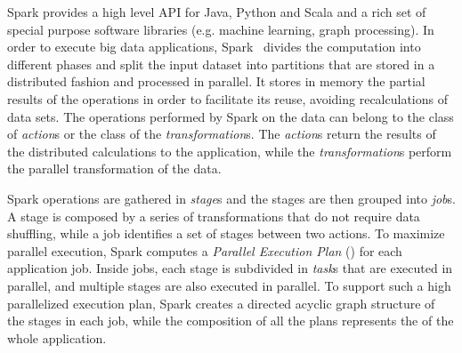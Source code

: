 Spark provides a high level API for Java, Python and Scala and a rich set of special purpose software libraries (e.g. machine learning, graph processing). In order to execute big data applications, Spark~\cite{Zaharia2010} divides the computation into different phases and split the input dataset into partitions that are stored in a distributed fashion and processed in parallel. It stores in memory the partial results of the operations in order to facilitate its reuse, avoiding recalculations of data sets. 
The operations performed by Spark on the data can belong to the class of \textit{action}s or the class of the \textit{transformation}s. The \textit{action}s return the results of the distributed calculations to the application, while the \textit{transformation}s perform the parallel transformation of the data. 


Spark operations are gathered in \textit{stage}s and the stages are then grouped into \textit{job}s. A stage is composed by a series of transformations that do not require data shuffling, while a job identifies a set of stages between two actions. To maximize parallel execution, Spark computes a \textit{Parallel Execution Plan} (\plan) for each application job. Inside jobs, each stage is subdivided in \textit{task}s that are executed in parallel, and multiple stages are also executed in parallel. To support such a high parallelized execution plan, Spark creates a directed acyclic graph structure of the stages in each job, while the composition of all the plans represents the \plan of the whole application.


